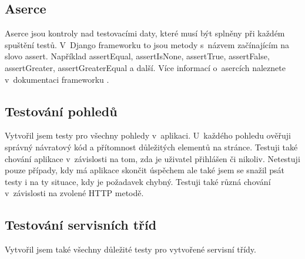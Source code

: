 \subsection{Aserce}
Aserce jsou kontroly nad testovacími daty, které musí být splněny při každém spuštění testů. V~Django frameworku to jsou metody s~názvem začínajícím na slovo assert. Například assertEqual, assertIsNone, assertTrue, assertFalse, assertGreater, assertGreaterEqual a další. Více informací o~asercích naleznete v~dokumentaci frameworku \cite{django-testing-tools}.

\subsection{Testování pohledů}
Vytvořil jsem testy pro všechny pohledy v~aplikaci. U~každého pohledu ověřuji správný návratový kód a přítomnost důležitých elementů na stránce. Testuji také chování aplikace v~závislosti na tom, zda je uživatel přihlášen či nikoliv. Netestuji pouze případy, kdy má aplikace skončit úspěchem ale také jsem se snažil psát testy i na ty situace, kdy je požadavek chybný. Testuji také různá chování v~závislosti na zvolené HTTP metodě.

\subsection{Testování servisních tříd}
Vytvořil jsem také všechny důležité testy pro vytvořené servisní třídy.
